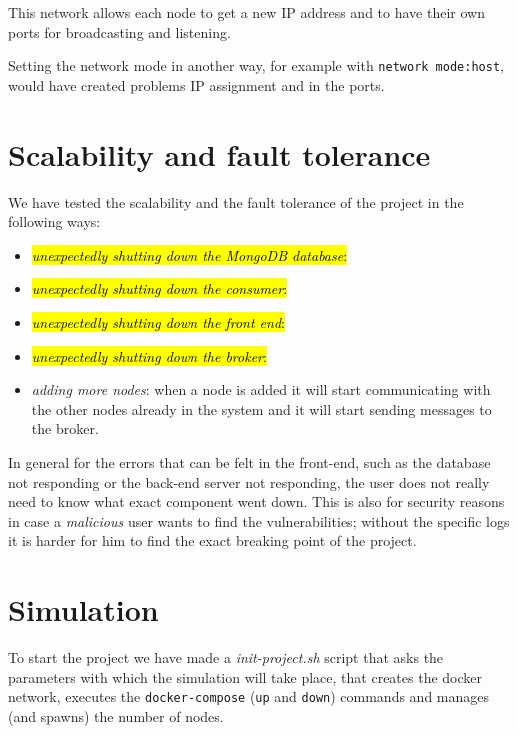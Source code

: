 \documentclass[conference]{IEEEtran}
\begin{document}
	This network allows each node to get a new IP address and to have their own ports for broadcasting and listening.
	
	Setting the network mode in another way, for example with \texttt{network mode:host}, would have created problems IP assignment and in the ports.
	
\section{Scalability and fault tolerance}\label{sec:scalability}

	We have tested the scalability and the fault tolerance of the project in the following ways:
	
	\begin{itemize}
		
		\item \hl{\textit{unexpectedly shutting down the MongoDB database}:}
		
		\item \hl{\textit{unexpectedly shutting down the consumer}:}
		
		\item \hl{\textit{unexpectedly shutting down the front end}:}
		
		\item \hl{\textit{unexpectedly shutting down the broker}:}
		
		\item \textit{adding more nodes}: when a node is added it will start communicating with the other nodes already in the system and it will start sending messages to the broker.
		
	\end{itemize}

	In general for the errors that can be felt in the front-end, such as the database not responding or the back-end server not responding, the user does not really need to know what exact component went down.
	This is also for security reasons in case a \textit{malicious} user wants to find the vulnerabilities; without the specific logs it is harder for him to find the exact breaking point of the project.
	
\section{Simulation}\label{sec:simulation}

	To start the project we have made a \textit{init-project.sh} script that asks the parameters with which the simulation will take place, that creates the docker network, executes the \texttt{docker-compose} (\texttt{up} and \texttt{down}) commands and manages (and spawns) the number of nodes.
	
\end{document}
